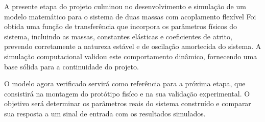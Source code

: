 \documentclass[9pt,a4paper,twocolumn,twoside]{tau-class/tau}
\begin{document}
 A presente etapa do projeto culminou no desenvolvimento e simulação de um modelo matemático para o sistema de duas massas com acoplamento flexível Foi obtida uma função de transferência que incorpora os parâmetros físicos do sistema, incluindo as massas, constantes elásticas e coeficientes de atrito, prevendo corretamente a natureza estável e de oscilação amortecida do sistema. A simulação computacional validou este comportamento dinâmico, fornecendo uma base sólida para a continuidade do projeto.

 O modelo agora verificado servirá como referência para a próxima etapa, que consistirá na montagem do protótipo fisíco e na sua validação experimental. O objetivo será determinar os parâmetros reais do sistema construído e comparar sua resposta a um sinal de entrada com os resultados simulados.



\printbibliography

\end{document}
